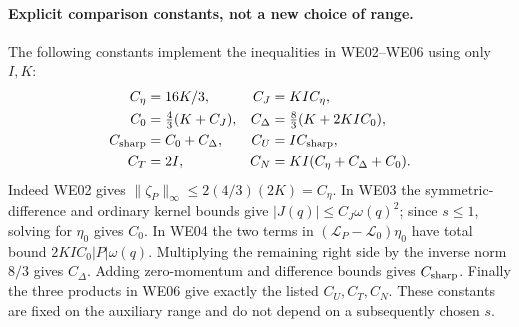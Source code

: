 \documentclass[11pt,a4paper]{article}
\theoremstyle{remark}\newtheorem{remark}[theorem]{Remark}
\begin{document}
\paragraph{Explicit comparison constants, not a new choice of range.}
The following constants implement the inequalities in WE02--WE06 using only $I,K$:
\begin{align*}
 C_\eta&=16K/3, & C_J&=KIC_\eta,\\
 C_0&=\tfrac43(K+C_J), & C_\Delta&=\tfrac83(K+2KIC_0),\\
 C_{\rm sharp}&=C_0+C_\Delta, & C_U&=I C_{\rm sharp},\\
 C_T&=2I, & C_N&=KI(C_\eta+C_\Delta+C_0).
\end{align*}
Indeed WE02 gives $\|\zeta_P\|_\infty\leq2(4/3)(2K)=C_\eta$. In WE03 the symmetric-difference and ordinary kernel bounds give $|J(q)|\leq C_J\omega(q)^2$; since $s\leq1$, solving for $\eta_0$ gives $C_0$. In WE04 the two terms in $(\mathcal L_P-\mathcal L_0)\eta_0$ have total bound $2KIC_0|P|\omega(q)$. Multiplying the remaining right side by the inverse norm $8/3$ gives $C_\Delta$. Adding zero-momentum and difference bounds gives $C_{\rm sharp}$. Finally the three products in WE06 give exactly the listed $C_U,C_T,C_N$. These constants are fixed on the auxiliary range and do not depend on a subsequently chosen $s$.
\end{document}

